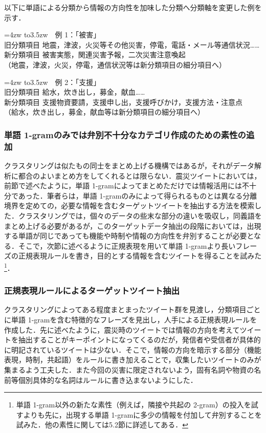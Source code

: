 \documentclass[japanese]{jnlp_1.4}
\begin{document}
以下に単語による分類から情報の方向性を加味した分類へ分類軸を変更した例を示す．

\hangindent=4zw\noindent
\hbox to3.5zw{　例 1：}「被害」\\
旧分類項目 地震，津波，火災等その他災害，停電，電話・メール等通信状況……\\ 
新分類項目 被害実態，関連災害予報，二次災害注意喚起 \\
（地震，津波，火災，停電，通信状況等は新分類項目の細分項目へ）
\pagebreak

\hangindent=4zw\noindent
\hbox to3.5zw{　例 2：}「支援」\\
旧分類項目 給水，炊き出し，募金，献血……\\
新分類項目 支援物資要請，支援申し出，支援呼びかけ，支援方法・注意点 \\
（給水，炊き出し，募金，献血等は新分類項目の細分項目へ）


\subsubsection{単語 1-gramのみでは弁別不十分なカテゴリ作成のための素性の追加}

クラスタリングは似たもの同士をまとめ上げる機構ではあるが，それがデータ解析に都合のよいまとめ方をしてくれるとは限らない．震災ツイートにおいては，前節で述べたように，単語 1-gramによってまとめただけでは情報活用には不十分であった．筆者らは，単語 1-gramのみによって得られるものとは異なる分離境界を定めての，必要な情報を含むターゲットツイートを抽出する方法を模索した．クラスタリングでは，個々のデータの些末な部分の違いを吸収し，同義語をまとめ上げる必要があるが，このターゲットデータ抽出の段階においては，出現する単語が同じであっても機能や時制や情報の方向性を弁別することが必要となる．そこで，次節に述べるように正規表現を用いて単語 1-gramより長いフレーズの正規表現ルールを書き，目的とする情報を含むツイートを得ることを試みた\footnote{単語 1-gram以外の新たな素性（例えば，隣接や共起の 2-gram）の投入を試すよりも先に，出現する単語 1-gramに多少の情報を付加して弁別することを試みた．他の素性に関しては5.2節に詳述してある．}．


\subsubsection{正規表現ルールによるターゲットツイート抽出}

クラスタリングによってある程度まとまったツイート群を見渡し，分類項目ごとに単語 1-gramを含む特徴的なフレーズを見出し，人手による正規表現ルールを作成した．先に述べたように，震災時のツイートでは情報の方向を考えてツイートを抽出することがキーポイントになってくるのだが，発信者や受信者が具体的に明記されているツイートは少ない．そこで，情報の方向を暗示する部分（機能表現，時制，共起語）をルールに書き加えることで，収集したいツイートのみが集まるよう工夫した．また今回の災害に限定されないよう，固有名詞や物資の名前等個別具体的な名詞はルールに書き込まないようにした． 
\end{document}
